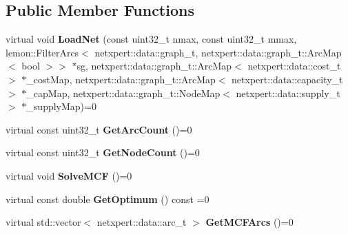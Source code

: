 \subsection*{Public Member Functions}
\begin{DoxyCompactItemize}
\item 
virtual void {\bfseries Load\+Net} (const uint32\+\_\+t nmax, const uint32\+\_\+t mmax, lemon\+::\+Filter\+Arcs$<$ netxpert\+::data\+::graph\+\_\+t, netxpert\+::data\+::graph\+\_\+t\+::\+Arc\+Map$<$ bool $>$$>$ $\ast$sg, netxpert\+::data\+::graph\+\_\+t\+::\+Arc\+Map$<$ netxpert\+::data\+::cost\+\_\+t $>$ $\ast$\+\_\+cost\+Map, netxpert\+::data\+::graph\+\_\+t\+::\+Arc\+Map$<$ netxpert\+::data\+::capacity\+\_\+t $>$ $\ast$\+\_\+cap\+Map, netxpert\+::data\+::graph\+\_\+t\+::\+Node\+Map$<$ netxpert\+::data\+::supply\+\_\+t $>$ $\ast$\+\_\+supply\+Map)=0\hypertarget{classnetxpert_1_1core_1_1IMinCostFlow_afe4ac0e1320c36cbccbb6c97e0c05765}{}\label{classnetxpert_1_1core_1_1IMinCostFlow_afe4ac0e1320c36cbccbb6c97e0c05765}

\item 
virtual const uint32\+\_\+t {\bfseries Get\+Arc\+Count} ()=0\hypertarget{classnetxpert_1_1core_1_1IMinCostFlow_afc43c05d492c96e3795c844636ff3a6a}{}\label{classnetxpert_1_1core_1_1IMinCostFlow_afc43c05d492c96e3795c844636ff3a6a}

\item 
virtual const uint32\+\_\+t {\bfseries Get\+Node\+Count} ()=0\hypertarget{classnetxpert_1_1core_1_1IMinCostFlow_a0d09f6b1be2a843c3dd8da0377cd43ba}{}\label{classnetxpert_1_1core_1_1IMinCostFlow_a0d09f6b1be2a843c3dd8da0377cd43ba}

\item 
virtual void {\bfseries Solve\+M\+CF} ()=0\hypertarget{classnetxpert_1_1core_1_1IMinCostFlow_a4730faf5a646cb01130a3dd36e3205ba}{}\label{classnetxpert_1_1core_1_1IMinCostFlow_a4730faf5a646cb01130a3dd36e3205ba}

\item 
virtual const double {\bfseries Get\+Optimum} () const =0\hypertarget{classnetxpert_1_1core_1_1IMinCostFlow_a2828271d5ac69c015f431cd5793ab661}{}\label{classnetxpert_1_1core_1_1IMinCostFlow_a2828271d5ac69c015f431cd5793ab661}

\item 
virtual std\+::vector$<$ netxpert\+::data\+::arc\+\_\+t $>$ {\bfseries Get\+M\+C\+F\+Arcs} ()=0\hypertarget{classnetxpert_1_1core_1_1IMinCostFlow_a664df6422560419a23e49c5948e4ace4}{}\label{classnetxpert_1_1core_1_1IMinCostFlow_a664df6422560419a23e49c5948e4ace4}


\end{DoxyCompactItemize}
